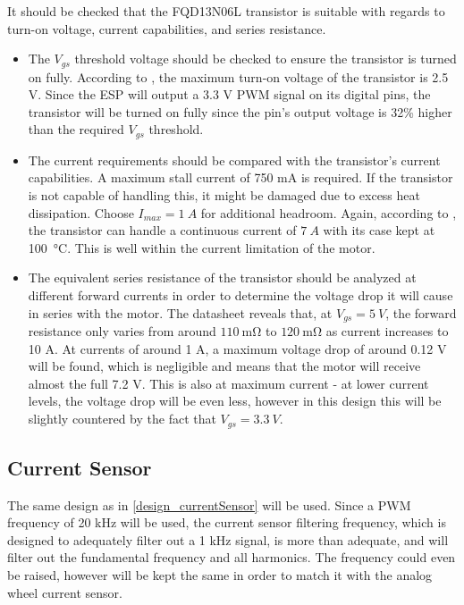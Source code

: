 It should be checked that the FQD13N06L transistor is suitable with regards to turn-on voltage, current capabilities, and series resistance.
\begin{itemize}
    \item The $V_{gs}$ threshold voltage should be checked to ensure the transistor is turned on fully. According to \cite{datasheetFQD13N06L},
          the maximum turn-on voltage of the transistor is 2.5 V. Since the ESP will output a 3.3 V PWM signal on its digital pins,
          the transistor will be turned on fully since the pin's output voltage is 32\% higher than the required $V_{gs}$ threshold.
    \item The current requirements should be compared with the transistor's current capabilities. A maximum stall current of 750 mA is required.
          If the transistor is not capable of handling this, it might be damaged due to excess heat dissipation. Choose $I_{max} = \SI{1}{A}$ for additional headroom.
          Again, according to \cite{datasheetFQD13N06L}, the transistor can handle a continuous current of $\SI{7}{A}$ with its case kept at \SI{100}{\celsius}. This is well
          within the current limitation of the motor.
    \item The equivalent series resistance of the transistor should be analyzed at different forward currents in order to determine the voltage drop it will cause
          in series with the motor. The datasheet reveals that, at $V_{gs} = \SI{5}{V}$, the forward resistance only varies from around $\SI{110}{\milli\ohm}$ to $\SI{120}{\milli\ohm}$
          as current increases to 10 A. At currents of around 1 A, a maximum voltage drop of around 0.12 V will be found, which is negligible and means that the motor will receive almost the
          full 7.2 V. This is also at maximum current - at lower current levels, the voltage drop will be even less, however in this design this will be slightly countered by the fact that
          $V_{gs} = \SI{3.3}{V}$.
\end{itemize}

\subsection{Current Sensor}

The same design as in \ref{design_currentSensor} will be used. Since a PWM frequency of 20 kHz will be used, the current sensor filtering frequency,
which is designed to adequately filter out a 1 kHz signal, is more than adequate, and will filter out the fundamental frequency and all harmonics.
The frequency could even be raised, however will be kept the same in order to match it with the analog wheel current sensor.

